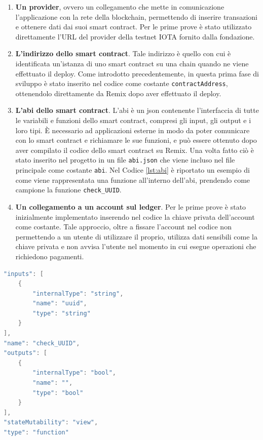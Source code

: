 \documentclass[12pt,a4paper,openright,twoside]{report}
\begin{document}
\begin{enumerate}[font=\bfseries]\label{connect_contract}
    \item \textbf{Un provider}, ovvero un collegamento che mette in comunicazione l’applicazione con la rete della blockchain, permettendo di inserire transazioni e ottenere dati dai suoi smart contract. Per le prime prove è stato utilizzato direttamente l'URL del provider della testnet IOTA fornito dalla fondazione.
    \item \textbf{L'indirizzo dello smart contract}. Tale indirizzo è quello con cui è identificata un'istanza di uno smart contract su una chain quando ne viene effettuato il deploy. Come introdotto precedentemente, in questa prima fase di sviluppo è stato inserito nel codice come costante \texttt{contractAddress}, ottenendolo direttamente da Remix dopo aver effettuato il deploy. 
    \item \textbf{L'\acrshort{abi} dello smart contract}. L'\acrfull{abi} è un json contenente
    l’interfaccia di tutte le variabili e funzioni dello smart contract, compresi gli input, gli output e i loro tipi. È necessario ad applicazioni esterne in modo da poter comunicare con lo smart contract e richiamare le sue funzioni, e può essere ottenuto dopo aver compilato il codice dello smart contract su Remix. Una volta fatto ciò è stato inserito nel progetto in un file \texttt{abi.json} che viene incluso nel file principale come costante \texttt{abi}. Nel Codice \ref{lst:abi} è riportato un esempio di come viene rappresentata una funzione all'interno dell'\acrshort{abi}, prendendo come campione la funzione \texttt{check\_UUID}.
    \item \textbf{Un collegamento a un account sul ledger}. Per le prime prove è stato inizialmente implementato inserendo nel codice la chiave privata dell'account come costante. Tale approccio, oltre a fissare l'account nel codice non permettendo a un utente di utilizzare il proprio, utilizza dati sensibili come la chiave privata e non avvisa l'utente nel momento in cui esegue operazioni che richiedono pagamenti.
\end{enumerate}
\begin{lstlisting}[language=Java, caption=Interfaccia di funzione nell'\acrshort{abi}, label={lst:abi}]
"inputs": [
    {
        "internalType": "string",
        "name": "uuid",
        "type": "string"
    }
],
"name": "check_UUID",
"outputs": [
    {
        "internalType": "bool",
        "name": "",
        "type": "bool"
    }
],
"stateMutability": "view",
"type": "function"
\end{lstlisting}
\end{document}
